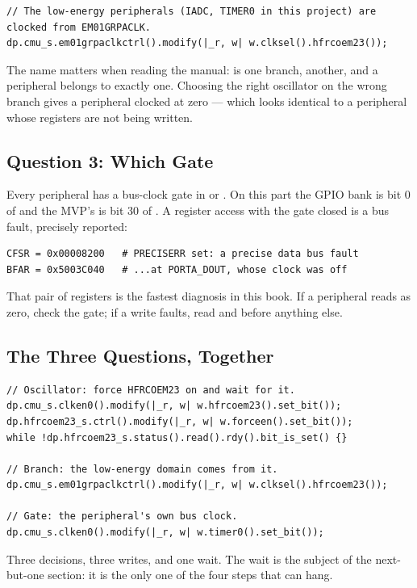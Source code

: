 \begin{verbatim}
// The low-energy peripherals (IADC, TIMER0 in this project) are clocked from EM01GRPACLK.
dp.cmu_s.em01grpaclkctrl().modify(|_r, w| w.clksel().hfrcoem23());
\end{verbatim}

The name matters when reading the manual:  is one branch,
 another, and a peripheral belongs to exactly one. Choosing the right
oscillator on the wrong branch gives a peripheral clocked at zero — which looks identical to a
peripheral whose registers are not being written.

\subsection{Question 3: Which Gate}

Every peripheral has a bus-clock gate in  or . On
this part the GPIO bank is bit 0 of  and the MVP's is bit 30 of
. A register access with the gate closed is a bus fault, precisely reported:

\begin{verbatim}
CFSR = 0x00008200   # PRECISERR set: a precise data bus fault
BFAR = 0x5003C040   # ...at PORTA_DOUT, whose clock was off
\end{verbatim}

That pair of registers is the fastest diagnosis in this book. If a peripheral reads as zero, check
the gate; if a write faults, read  and  before anything else.

\subsection{The Three Questions, Together}

\begin{verbatim}
// Oscillator: force HFRCOEM23 on and wait for it.
dp.cmu_s.clken0().modify(|_r, w| w.hfrcoem23().set_bit());
dp.hfrcoem23_s.ctrl().modify(|_r, w| w.forceen().set_bit());
while !dp.hfrcoem23_s.status().read().rdy().bit_is_set() {}

// Branch: the low-energy domain comes from it.
dp.cmu_s.em01grpaclkctrl().modify(|_r, w| w.clksel().hfrcoem23());

// Gate: the peripheral's own bus clock.
dp.cmu_s.clken0().modify(|_r, w| w.timer0().set_bit());
\end{verbatim}

Three decisions, three writes, and one wait. The wait is the subject of the next-but-one section: it
is the only one of the four steps that can hang.
